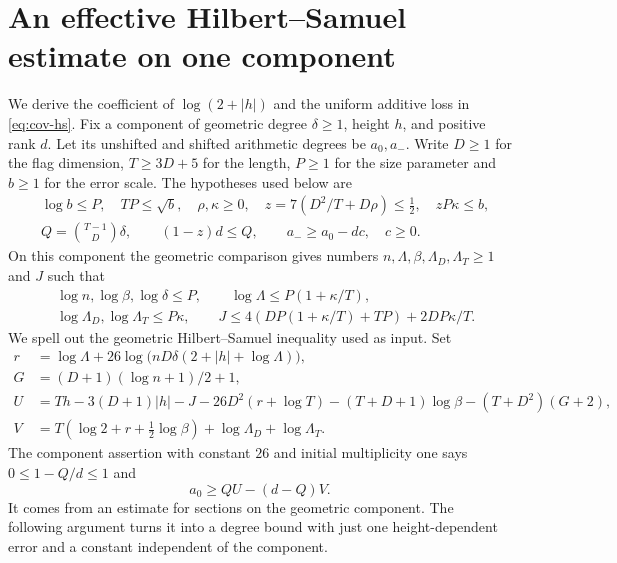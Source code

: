 \section{An effective Hilbert--Samuel estimate on one component}
\label{sec:hs-component}
We derive the coefficient of \(\log(2+|h|)\) and the uniform additive
loss in \eqref{eq:cov-hs}. Fix a component of geometric degree
\(\delta\ge1\), height \(h\), and positive rank \(d\). Let its
unshifted and shifted arithmetic degrees be \(a_0,a_-\).
Write \(D\ge1\) for the flag dimension, \(T\ge3D+5\) for the length,
\(P\ge1\) for the size parameter and \(b\ge1\) for the error scale.
The hypotheses used below are
\begin{align*}
 &\log b\le P,\quad TP\le\sqrt b,\quad \rho,\kappa\ge0,\quad
 z=7(D^2/T+D\rho)\le\tfrac12,\quad zP\kappa\le b,\\
 &Q=\binom{T-1}{D}\delta,\qquad (1-z)d\le Q,\qquad
 a_-\ge a_0-dc,\quad c\ge0 .
\end{align*}
On this component the geometric comparison gives numbers
\(n,\Lambda,\beta,\Lambda_D,\Lambda_T\ge1\) and \(J\) such that
\begin{align*}
 &\log n,\log\beta,\log\delta\le P,\qquad
 \log\Lambda\le P(1+\kappa/T),\\
 &\log\Lambda_D,\log\Lambda_T\le P\kappa,\qquad
 J\le 4(DP(1+\kappa/T)+TP)+2DP\kappa/T .
\end{align*}
We spell out the geometric Hilbert--Samuel inequality used as input.
Set
\begin{align*}
 r&=\log\Lambda+26\log\big(nD\delta(2+|h|+\log\Lambda)\big),\\
 G&=(D+1)(\log n+1)/2+1,\\
 U&=Th-3(D+1)|h|-J-26D^2(r+\log T)
              -(T+D+1)\log\beta-(T+D^2)(G+2),\\
 V&=T(\log2+r+\tfrac12\log\beta)+\log\Lambda_D+\log\Lambda_T .
\end{align*}
The component assertion with constant \(26\) and initial multiplicity
one says \(0\le1-Q/d\le1\) and
\[
             a_0\ge Q U-(d-Q)V .
\]
It comes from an estimate for sections on the geometric component.
The following argument turns it into a degree bound with just one
height-dependent error and a constant independent of the component.


